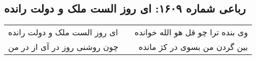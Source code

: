 \begin{center}
\section*{رباعی شماره ۱۶۰۹: ای روز الست ملک و دولت رانده}
\label{sec:1609}
\begin{longtable}{l p{0.5cm} r}
ای روز الست ملک و دولت رانده
&&
وی بنده ترا چو قل هو الله خوانده
\\
چون روشنی روز در آی از در من
&&
بین گردن من بسوی در کژ مانده
\\
\end{longtable}
\end{center}
